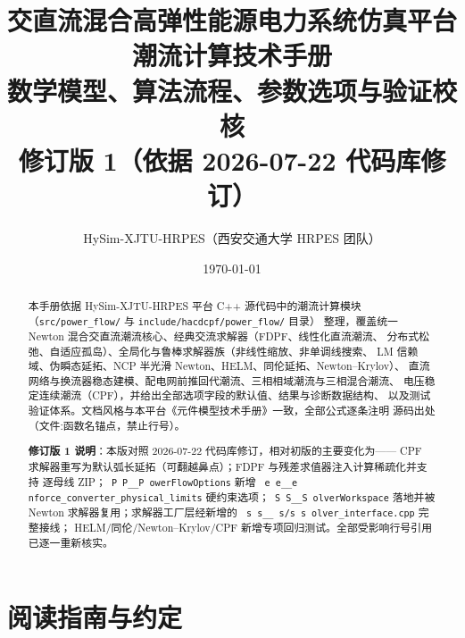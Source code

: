 \documentclass[UTF8,fontset=fandol,a4paper,11pt]{ctexart}
\title{\textbf{交直流混合高弹性能源电力系统仿真平台}\\[0.5em]
       {\Large 潮流计算技术手册}\\[0.3em]
       {\large 数学模型、算法流程、参数选项与验证校核}\\[0.3em]
       {\large 修订版 1（依据 2026-07-22 代码库修订）}}
\author{HySim-XJTU-HRPES（西安交通大学 HRPES 团队）}
\date{\today}
\makeatletter
\newcommand{\fld}[1]{\texttt{\fld@scan#1\fld@stop}}
\def\fld@scan#1{%
  \ifx#1\fld@stop
  \else
    \ifx#1\_\_\allowbreak\else#1\fi
    \expandafter\fld@scan
  \fi}
\newcommand{\srcpath}[1]{\texttt{\src@scan#1\src@stop}}
\def\src@scan#1{%
  \ifx#1\src@stop
  \else
    \ifx#1\_\_\allowbreak\else
    \ifx#1/#1\allowbreak\else
    #1\fi\fi
    \expandafter\src@scan
  \fi}
\makeatother
\begin{document}
\maketitle
\begin{abstract}
\noindent 本手册依据 HySim-XJTU-HRPES 平台 C++ 源代码中的潮流计算模块
（\texttt{src/\allowbreak power\_flow/} 与 \texttt{include/\allowbreak hacdcpf/\allowbreak power\_flow/} 目录）
整理，覆盖统一 Newton 混合交直流潮流核心、经典交流求解器（FDPF、线性化直流潮流、
分布式松弛、自适应孤岛）、全局化与鲁棒求解器族（非线性缩放、非单调线搜索、
LM 信赖域、伪瞬态延拓、NCP 半光滑 Newton、HELM、同伦延拓、Newton--Krylov）、
直流网络与换流器稳态建模、配电网前推回代潮流、三相相域潮流与三相混合潮流、
电压稳定连续潮流（CPF），并给出全部选项字段的默认值、结果与诊断数据结构、
以及测试验证体系。文档风格与本平台《元件模型技术手册》一致，全部公式逐条注明
源码出处（文件:函数名锚点，禁止行号）。

\smallskip
\noindent\textbf{修订版 1 说明}：本版对照 2026-07-22 代码库修订，相对初版的主要变化为——
CPF 求解器重写为默认弧长延拓（可翻越鼻点）；FDPF 与残差求值器注入计算稀疏化并支持
逐母线 ZIP；\fld{PowerFlowOptions} 新增
\fld{enforce\_converter\_physical\_limits} 硬约束选项；\fld{SolverWorkspace} 落地并被
Newton 求解器复用；求解器工厂层经新增的 \srcpath{solver\_interface.cpp} 完整接线；
HELM/同伦/Newton--Krylov/CPF 新增专项回归测试。全部受影响行号引用已逐一重新核实。
\end{abstract}

\tableofcontents
\newpage

\section{阅读指南与约定}
\end{document}
